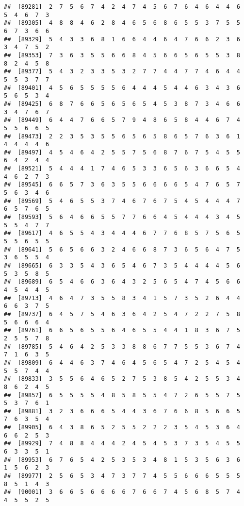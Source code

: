 \documentclass[
]{book}
\begin{document}
\begin{verbatim}
##  [89281]  2  7  5  6  7  4  2  4  7  4  5  6  7  6  4  6  4  4  6  5  4  6  7  3
##  [89305]  4  8  8  4  6  2  8  4  6  5  6  8  6  5  5  3  7  5  5  6  7  3  6  6
##  [89329]  5  4  3  3  6  8  1  6  6  4  4  6  4  7  6  6  2  3  6  3  4  7  5  2
##  [89353]  7  3  6  3  5  5  6  6  8  4  5  6  6  5  6  5  5  3  8  8  2  4  5  8
##  [89377]  5  4  3  2  3  3  5  3  2  7  7  4  4  7  7  4  6  4  4  5  5  3  7  7
##  [89401]  4  5  6  5  5  5  5  6  4  4  4  5  4  4  6  3  4  3  6  5  6  5  3  4
##  [89425]  6  8  7  6  6  5  6  5  6  5  4  5  3  8  7  3  4  6  6  3  4  7  6  7
##  [89449]  6  4  4  7  6  6  5  7  9  4  8  6  5  8  4  4  6  7  4  5  5  6  6  5
##  [89473]  2  2  3  5  3  5  5  6  5  6  5  8  6  5  7  6  3  6  1  4  4  4  4  6
##  [89497]  4  5  4  6  4  2  5  5  7  5  6  8  7  6  7  5  4  5  5  6  4  2  4  4
##  [89521]  5  4  4  4  1  7  4  6  5  3  3  6  5  6  3  6  6  5  4  4  6  2  7  3
##  [89545]  6  6  5  7  3  6  3  5  5  6  6  6  6  5  4  7  6  5  7  5  6  3  4  6
##  [89569]  5  4  6  5  5  3  7  4  6  7  6  7  5  4  5  4  4  4  7  6  5  7  6  5
##  [89593]  5  6  4  6  6  5  5  7  7  6  6  4  5  4  4  4  3  4  5  5  5  4  7  7
##  [89617]  4  6  5  5  4  3  4  4  4  6  7  7  6  8  5  7  5  6  5  5  5  6  5  5
##  [89641]  5  6  5  6  6  3  2  4  6  6  8  7  3  6  5  6  4  7  5  3  6  5  5  4
##  [89665]  6  3  3  5  4  3  6  5  4  6  7  3  5  4  4  4  4  5  6  5  3  5  8  5
##  [89689]  6  5  4  6  6  3  6  4  3  2  5  6  5  4  7  4  5  6  6  4  5  4  4  5
##  [89713]  4  6  4  7  3  5  5  8  3  4  1  5  7  3  5  2  6  4  4  6  6  3  7  5
##  [89737]  6  4  5  7  5  4  6  3  6  4  2  5  4  7  2  2  7  5  8  5  6  6  6  4
##  [89761]  6  6  5  6  5  5  6  4  6  5  5  4  4  1  8  3  6  7  5  2  5  5  7  8
##  [89785]  5  4  6  4  2  5  3  3  8  8  6  7  7  5  5  3  6  7  4  7  1  6  3  5
##  [89809]  6  4  4  6  3  7  4  6  4  5  6  5  4  7  2  5  4  5  4  5  5  7  4  4
##  [89833]  3  5  5  6  4  6  5  2  7  5  3  8  5  4  2  5  5  3  4  8  6  2  4  5
##  [89857]  6  5  5  5  5  4  8  5  8  5  5  4  7  2  6  5  5  7  5  5  3  7  6  1
##  [89881]  3  2  3  6  6  6  5  4  4  3  6  7  6  6  8  5  6  6  5  7  6  3  5  4
##  [89905]  6  4  3  8  6  5  2  5  5  2  2  2  3  5  4  5  3  6  4  6  6  2  5  3
##  [89929]  7  4  8  8  4  4  4  2  4  5  4  5  3  7  3  5  4  5  5  6  3  3  5  1
##  [89953]  6  7  6  5  4  2  5  3  5  3  4  8  1  5  3  5  6  3  6  1  5  6  2  3
##  [89977]  2  5  6  5  3  4  7  3  7  7  4  5  5  6  6  6  5  5  5  8  5  1  4  3
##  [90001]  3  6  6  5  6  6  6  6  7  6  6  7  4  5  6  8  5  7  4  4  5  5  2  5

\end{verbatim}
\end{document}

